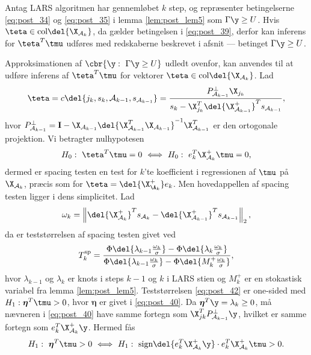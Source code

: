 %
\begin{lem}
Antag LARS algoritmen har gennemløbet \(k\) step, og repræsenter betingelserne \eqref{eq:post_34} og \eqref{eq:post_35} i lemma \ref{lem:post_lem5} som \(\Gamma \y \geq U\).
Hvis \(\teta \in \text{col} \del{\X_{\mathcal{A}_k}}\), da gælder betingelsen i \eqref{eq:post_39}, derfor kan inferens for \(\teta^T \tmu\) udføres med redskaberne beskrevet i afsnit --- betinget \(\Gamma \y \geq U\).
\end{lem}
%

Approksimationen af \(\cbr{\y : \ \Gamma \y \geq U}\) udledt ovenfor, kan anvendes til at udføre inferens af \(\teta^T \tmu\) for vektorer \(\teta \in \text{col} \del{\X_{\mathcal{A}_k}} \).
Lad
\begin{align}
\teta = c \del{j_k, s_k, \mathcal{A}_{k-1}, s_{\mathcal{A}_{k-1}}} = \frac{P_{\mathcal{A}_{k-1}}^\perp \X_{j_{k}}}{s_k - \X_{j_{k}}^T \del{\X_{\mathcal{A}_{k-1}}^+}^T s_{\mathcal{A}_{k-1}}}, \label{eq:post_40}
\end{align}
hvor \(P_{\mathcal{A}_{k-1}}^\perp = \mathbf{I} - \X_{\mathcal{A}_{k-1}} \del{\X_{\mathcal{A}_{k-1}}^T \X_{\mathcal{A}_{k-1}}}^{-1} \X_{\mathcal{A}_{k-1}}^T\) er den ortogonale projektion.
Vi betragter nulhypotesen
\begin{align*}
H_0: \ \teta^T \tmu = 0 \ \Longleftrightarrow \ H_0: \ e_k^T \X_{\mathcal{A}_k}^+ \tmu = 0,
\end{align*}
dermed er spacing testen en test for \(k\)'te koefficient i regressionen af \(\tmu\) på \(\X_{\mathcal{A}_k}\), præcis som for \(\teta = \del{\X_{\A_k}^+} e_k\).
Men hovedappellen af spacing testen ligger i dens simplicitet.
Lad
\begin{align}
\omega_k = \left\Vert \del{\X_{\mathcal{A}_k}^+}^T s_{\mathcal{A}_k} -   \del{\X_{\mathcal{A}_{k-1}}^+}^T s_{\mathcal{A}_{k-1}} \right\Vert_2, \label{eq:post_41}
\end{align}
da er teststørrelsen af spacing testen givet ved
\begin{align}
T_k^\text{sp}= \frac{\Phi \del{\lambda_{k-1} \frac{\omega_k}{\sigma}} - \Phi \del{\lambda_{k} \frac{\omega_k}{\sigma}}}{\Phi \del{\lambda_{k-1} \frac{\omega_k}{\sigma}} - \Phi \del{M_{k}^+ \frac{\omega_k}{\sigma}}}, \label{eq:post_42}
\end{align}
hvor \(\lambda_{k-1}\) og \(\lambda_k\) er knots i steps \(k-1\) og \(k\) i LARS stien og \(M_k^+\) er en stokastisk variabel fra lemma \ref{lem:post_lem5}.
Teststørrelsen \eqref{eq:post_42} er one-sided med \(H_1:\boldsymbol{\eta}^T \tmu > 0 \), hvor \(\boldsymbol{\eta}\) er givet i \eqref{eq:post_40}.
Da \(\boldsymbol{\eta}^T \y = \lambda_k \geq 0\), må nævneren i \eqref{eq:post_40} have samme fortegn som \(\X_{jk}^T P_{\mathcal{A}_{k-1}}^\perp \y \), hvilket er samme fortegn som \(e_k^T \X_{\mathcal{A}_k}^+ \y\).
Hermed fås
\begin{align*}
H_1: \ \boldsymbol{\eta}^T \tmu > 0 \ \Longleftrightarrow \ H_1: \ \text{sign} \del{e_k^T \X_{\mathcal{A}_k}^+ \y} \cdot e_k^T \X_{\mathcal{A}_k}^+ \tmu > 0.
\end{align*}



